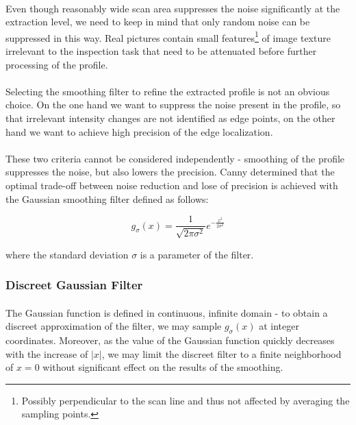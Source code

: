 \paragraph*{}
Even though reasonably wide scan area suppresses the noise significantly at the extraction level, we need to keep in mind that only random noise can be suppressed in this way. Real pictures contain small features\footnote{Possibly perpendicular to the scan line and thus not affected by averaging the sampling points.} of image texture irrelevant to the inspection task that need to be attenuated before further processing of the profile. 

\paragraph*{}
Selecting the smoothing filter to refine the extracted profile is not an obvious choice. On the one hand we want to suppress the noise present in the profile, so that irrelevant intensity changes are not identified as edge points, on the other hand we want to achieve high precision of the edge localization. 

\paragraph*{}
These two criteria cannot be considered independently - smoothing of the profile suppresses the noise, but also lowers the precision. Canny determined\cite{Canny86} that the optimal trade-off between noise reduction and lose of precision is achieved with the Gaussian smoothing filter defined as follows:

\[
    g_{\sigma}(x)= \frac{1}{\sqrt{2\pi \sigma^2}} e^{-\frac{x^2}{2 \sigma^2}}
\]

where the standard deviation $\sigma$ is a parameter of the filter.

\subsubsection{Discreet Gaussian Filter}

\paragraph*{}
The Gaussian function is defined in continuous, infinite domain - to obtain a discreet approximation of the filter, we may sample $g_{\sigma}(x)$ at integer coordinates\cite{JainKasturi95}. Moreover, as the value of the Gaussian function quickly decreases with the increase of $|x|$, we may limit the discreet filter to a finite neighborhood of $x = 0$ without significant effect on the results of the smoothing. 

